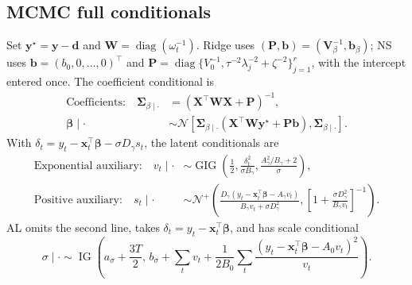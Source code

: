 \documentclass[12pt,letterpaper]{article}
\newcommand{\diag}{\operatorname{diag}}
\newcommand{\vect}[1]{\bm{#1}}
\newcommand{\mat}[1]{\bm{#1}}
\newcommand{\Normal}{\mathcal{N}}
\newcommand{\TN}{\mathcal{N}^{+}}
\newcommand{\IG}{\operatorname{IG}}
\newcommand{\GIG}{\operatorname{GIG}}
\numberwithin{suppalgorithm}{section}
\numberwithin{equation}{section}
\numberwithin{table}{section}
\numberwithin{figure}{section}
\begin{document}
\subsection{MCMC full conditionals}
\label{sec:mcmc}

Set \(\vect y^\star=\vect y-\vect d\) and
\(\mat W=\diag(\omega_t^{-1})\). Ridge uses
\((\mat P,\vect b)=(\mat V_\beta^{-1},\vect b_\beta)\); NS uses
\(\vect b=(b_0,0,\ldots,0)^\top\) and
\(\mat P=\diag\{V_0^{-1},\tau^{-2}\lambda_j^{-2}+\zeta^{-2}\}_{j=1}^r\),
with the intercept entered once. The coefficient conditional is
\begin{equation}
\begin{aligned}
\text{Coefficients:}\quad
\mat\Sigma_{\beta\mid\cdot}&=(\mat X^\top\mat W\mat X+\mat P)^{-1},\\
\vect\beta\mid\cdot&\sim\Normal\!\left[
 \mat\Sigma_{\beta\mid\cdot}
 (\mat X^\top\mat W\vect y^\star+\mat P\vect b),
 \mat\Sigma_{\beta\mid\cdot}\right].
\end{aligned}
\label{eq:supp_beta_mcmc}
\end{equation}
With \(\delta_t=y_t-\vect x_t^\top\vect\beta-\sigma D_\gamma s_t\),
the latent conditionals are
\begin{align}
\text{Exponential auxiliary:}\quad
v_t\mid\cdot&\sim\GIG\!\left(\tfrac12,
 \frac{\delta_t^2}{\sigma B_\gamma},
 \frac{A_\gamma^2/B_\gamma+2}{\sigma}\right),
\label{eq:supp_v_mcmc}\\
\text{Positive auxiliary:}\quad
s_t\mid\cdot&\sim\TN\!\left(
 \frac{D_\gamma(y_t-\vect x_t^\top\vect\beta-A_\gamma v_t)}
 {B_\gamma v_t+\sigma D_\gamma^2},
 \left[1+\frac{\sigma D_\gamma^2}{B_\gamma v_t}\right]^{-1}\right).
\label{eq:supp_s_mcmc}
\end{align}
AL omits the second line, takes \(\delta_t=y_t-\vect x_t^\top\vect\beta\),
and has scale conditional
\begin{equation}
\sigma\mid\cdot\sim\IG\!\left(a_\sigma+\frac{3T}{2},\,
 b_\sigma+\sum_t v_t+\frac{1}{2B_0}
 \sum_t\frac{(y_t-\vect x_t^\top\vect\beta-A_0v_t)^2}{v_t}\right).
\label{eq:supp_al_sigma_mcmc}
\end{equation}
\end{document}
